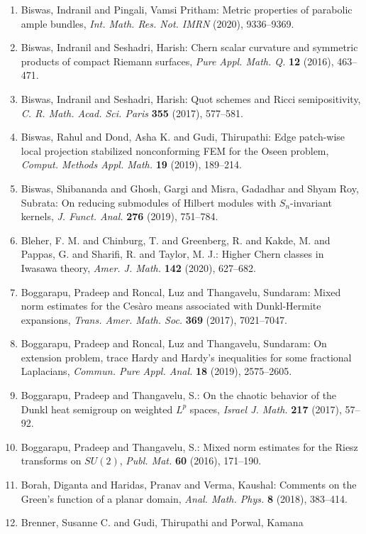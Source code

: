 \begin{enumerate}
\item Biswas, Indranil and Pingali, Vamsi Pritham: Metric properties of parabolic ample bundles, \emph{Int. Math. Res. Not. IMRN} {\bf } (2020), 9336--9369.
\item Biswas, Indranil and Seshadri, Harish: Chern scalar curvature and symmetric products of compact
{R}iemann surfaces, \emph{Pure Appl. Math. Q.} {\bf 12} (2016), 463--471.
\item Biswas, Indranil and Seshadri, Harish: Quot schemes and {R}icci semipositivity, \emph{C. R. Math. Acad. Sci. Paris} {\bf 355} (2017), 577--581.
\item Biswas, Rahul and Dond, Asha K. and Gudi, Thirupathi: Edge patch-wise local projection stabilized nonconforming
{FEM} for the {O}seen problem, \emph{Comput. Methods Appl. Math.} {\bf 19} (2019), 189--214.
\item Biswas, Shibananda and Ghosh, Gargi and Misra, Gadadhar and
Shyam Roy, Subrata: On reducing submodules of {H}ilbert modules with
{${S}_n$}-invariant kernels, \emph{J. Funct. Anal.} {\bf 276} (2019), 751--784.
\item Bleher, F. M. and Chinburg, T. and Greenberg, R. and Kakde, M.
and Pappas, G. and Sharifi, R. and Taylor, M. J.: Higher {C}hern classes in {I}wasawa theory, \emph{Amer. J. Math.} {\bf 142} (2020), 627--682.
\item Boggarapu, Pradeep and Roncal, Luz and Thangavelu, Sundaram: Mixed norm estimates for the {C}es\`aro means associated with
{D}unkl-{H}ermite expansions, \emph{Trans. Amer. Math. Soc.} {\bf 369} (2017), 7021--7047.
\item Boggarapu, Pradeep and Roncal, Luz and Thangavelu, Sundaram: On extension problem, trace {H}ardy and {H}ardy's inequalities
for some fractional {L}aplacians, \emph{Commun. Pure Appl. Anal.} {\bf 18} (2019), 2575--2605.
\item Boggarapu, Pradeep and Thangavelu, S.: On the chaotic behavior of the {D}unkl heat semigroup on
weighted {$L^p$} spaces, \emph{Israel J. Math.} {\bf 217} (2017), 57--92.
\item Boggarapu, Pradeep and Thangavelu, S.: Mixed norm estimates for the {R}iesz transforms on {$SU(2)$}, \emph{Publ. Mat.} {\bf 60} (2016), 171--190.
\item Borah, Diganta and Haridas, Pranav and Verma, Kaushal: Comments on the {G}reen's function of a planar domain, \emph{Anal. Math. Phys.} {\bf 8} (2018), 383--414.
\item Brenner, Susanne C. and Gudi, Thirupathi and Porwal, Kamana

\end{enumerate}
